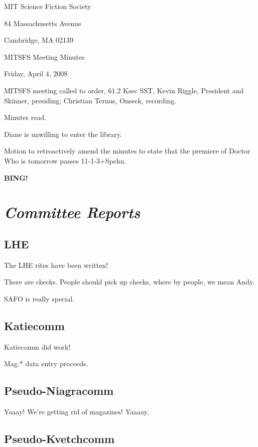 \documentclass[10pt]{article}
\newcommand{\bing}{{\bf BING!} }
\newcommand{\goto}[1]{\bing \vskip 12pt \section*{{\em{#1}}}}
\begin{document}
\begin{center}

MIT Science Fiction Society

84 Massachusetts Avenue

Cambridge, MA 02139

\vspace{12pt}

MITSFS Meeting Minutes

Friday, April 4, 2008

\end{center}

\vspace{18pt}

\setlength{\parskip}{6pt}

\noindent
MITSFS meeting called to order, 61.2 Ksec SST,
Kevin Riggle, President and Skinner, presiding; Christian Ternus, Onseck, recording.

Minutes read.

Diane is unwilling to enter the library.

Motion to retroactively amend the minutes to state that the premiere
of Doctor Who is tomorrow passes 11-1-3+Spehn.

\BING

\goto{Committee Reports}

\subsection*{LHE}

The LHE rites have been written!

There are checks.  People should pick up checks, where by people, we mean Andy.

SAFO is really special.

\subsection*{Katiecomm}

Katiecomm did work!

Mag.* data entry proceeds.

\subsection*{Pseudo-Niagracomm}

Yaaay! We're getting rid of magazines!  Yaaaay.

\subsection*{Pseudo-Kvetchcomm}
\end{document}
